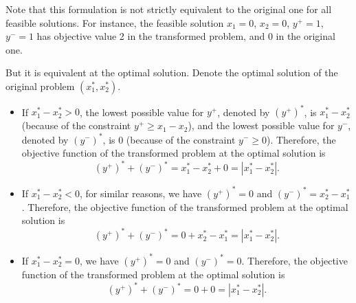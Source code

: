 Note that this formulation is not strictly equivalent to the original one for
all feasible solutions. For instance, the feasible solution $x_1=0$,
$x_2=0$, $y^+=1$, $y^-=1$ has objective value 2 in the transformed
problem, and 0 in the original one.

But it is equivalent at the optimal solution. Denote the optimal
solution of the original problem $(x_1^*,x_2^*)$.
\begin{itemize}
\item If $x_1^*-x_2^* > 0$, the lowest possible value for $y^+$,
  denoted by $(y^+)^*$, is
  $x_1^*-x_2^*$ (because of the constraint $y^+  \geq x_1-x_2$), and
  the lowest possible value for $y^-$, denoted by $(y^-)^*$, is $0$
  (because of the constraint $y^- \geq 0$). Therefore,
  the objective function of the transformed problem at the optimal
  solution is
  \[
(y^+)^* + (y^-)^* = x_1^*-x_2^* + 0 = |x_1^*-x_2^*|.
  \]
\item If $x_1^*-x_2^* < 0$, for similar reasons, we have
  $(y^+)^*=0$ and $(y^-)^*=x_2^*-x_1^*$. Therefore,
  the objective function of the transformed problem at the optimal
  solution is
  \[
(y^+)^* + (y^-)^* = 0 +x_2^*-x_1^* = |x_1^*-x_2^*|.
\]
\item If $x_1^*-x_2^* = 0$, we have
  $(y^+)^*=0$ and $(y^-)^*=0$. Therefore,
  the objective function of the transformed problem at the optimal
  solution is
  \[
(y^+)^* + (y^-)^* = 0 + 0 = |x_1^*-x_2^*|.
\]
\end{itemize}




